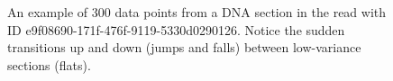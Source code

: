 \begin{figure}
\centering

\caption{\label{fig:dna300-section}An example of 300 data points from a DNA
	section in the read with ID e9f08690-171f-476f-9119-5330d0290126. Notice
	the sudden transitions up and down (jumps and falls) between
	low-variance sections (flats).}
\end{figure}
